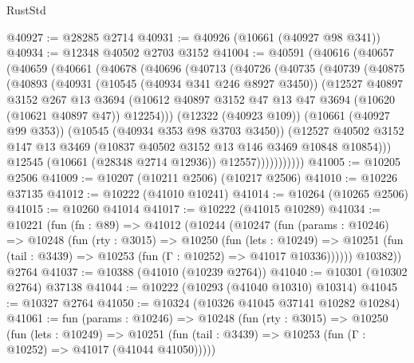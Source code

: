 \begin{lexlean}{RustStd}
\begin{coremodule}
@40927 := @28285 @2714
@40931 := @40926 (@10661 (@40927 @98 @341))
@40934 := @12348 @40502 @2703 @3152
@41004 := @40591
    (@40616
      (@40657
        (@40659
          (@40661
            (@40678
              (@40696
                (@40713
                  (@40726
                    (@40735
                      (@40739
                        (@40875
                          (@40893
                            (@40931
                              (@10545 (@40934 @341 @246 @8927 @3450))
                              (@12527
                                @40897
                                @3152
                                @267
                                @13
                                @3694
                                (@10612
                                  @40897
                                  @3152
                                  @47
                                  @13
                                  @47
                                  @3694
                                  (@10620 (@10621 @40897 @47))
                                  @12254)))
                            (@12322 (@40923 @109))
                            (@10661 (@40927 @99 @353))
                            (@10545 (@40934 @353 @98 @3703 @3450))
                            (@12527
                              @40502
                              @3152
                              @147
                              @13
                              @3469
                              (@10837 @40502 @3152 @13 @146 @3469 @10848 @10854)))
                          @12545
                          (@10661 (@28348 @2714 @12936))
                          @12557)))))))))))
@41005 := @10205 @2506
@41009 := @10207 (@10211 @2506) (@10217 @2506)
@41010 := @10226 @37135
@41012 := @10222 (@41010 @10241)
@41014 := @10264 (@10265 @2506)
@41015 := @10260 @41014
@41017 := @10222 (@41015 @10289)
@41034 := @10221
    (fun (fn : @89) =>
    @41012
      (@10244
        (@10247
          (fun (params : @10246) =>
          @10248
            (fun (rty : @3015) =>
            @10250
              (fun (lets : @10249) =>
              @10251 (fun (tail : @3439) => @10253 (fun (Γ : @10252) => @41017 @10336))))))
        @10382))
    @2764
@41037 := @10388 (@41010 (@10239 @2764))
@41040 := @10301 (@10302 @2764) @37138
@41044 := @10222 (@10293 (@41040 @10310) @10314)
@41045 := @10327 @2764
@41050 := @10324 (@10326 @41045 @37141 @10282 @10284)
@41061 := fun (params : @10246) =>
  @10248
    (fun (rty : @3015) =>
    @10250
      (fun (lets : @10249) =>
      @10251 (fun (tail : @3439) => @10253 (fun (Γ : @10252) => @41017 (@41044 @41050)))))

\end{coremodule}
\end{lexlean}

